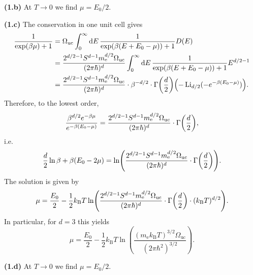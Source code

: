 \documentclass{article}
\makeatletter
\newcommand*{\shifttext}[1]{%
  \settowidth{\@tempdima}{#1}%
  \hspace{-\@tempdima}#1%
}
\newcommand{\plabel}[1]{%
\shifttext{\textbf{#1}\quad}%
}
\makeatother
\begin{document}
\plabel{(1.b)}%
At $T\rightarrow 0$ we find $\mu = E_0/2$.

\plabel{(1.c)}%
The conservation in one unit cell gives
\begin{align*}
  \frac{1}{\exp(\beta \mu) + 1} &= \Omega_{\mathrm{uc}} \int_{0}^\infty \dd{E} \frac{1}{\exp(\beta(E + E_0 - \mu)) + 1} D(E) \\
  &= \frac{2^{d/2-1} S^{d-1} m^{d/2}_{\mathrm{e}}\Omega_{\mathrm{uc}}}{(2\pi\hbar)^d} \int_{0}^\infty \dd{E} \frac{1}{\exp(\beta(E + E_0 - \mu)) + 1} E^{d/2-1} \\
  &= \frac{2^{d/2-1} S^{d-1} m^{d/2}_{\mathrm{e}}\Omega_{\mathrm{uc}}}{(2\pi\hbar)^d} \cdot \beta^{-d/2} \cdot \Gamma\qty(\frac{d}{2}) \qty(-\operatorname{Li}_{d/2} (-e^{-\beta(E_0 - \mu)})).
\end{align*}
Therefore, to the lowest order,
\begin{align*}
  \frac{\beta^{d/2} e^{-\beta\mu}}{e^{-\beta(E_0 - \mu)}} = \frac{2^{d/2-1} S^{d-1} m^{d/2}_{\mathrm{e}}\Omega_{\mathrm{uc}}}{(2\pi\hbar)^d} \cdot \Gamma\qty(\frac{d}{2}),
\end{align*}
i.e.
\[ \frac{d}{2}\ln\beta + \beta(E_0 - 2\mu) = \ln(\frac{2^{d/2-1} S^{d-1} m^{d/2}_{\mathrm{e}}\Omega_{\mathrm{uc}}}{(2\pi\hbar)^d} \cdot \Gamma\qty(\frac{d}{2})). \]
The solution is given by
\[ \mu = \frac{E_0}{2} - \frac{1}{2} k_{\mathrm{B}}T\ln(\frac{2^{d/2-1} S^{d-1} m^{d/2}_{\mathrm{e}}\Omega_{\mathrm{uc}}}{(2\pi\hbar)^d} \cdot \Gamma\qty(\frac{d}{2}) \cdot (k_{\mathrm{B}} T)^{d/2}). \]
In particular, for $d=3$ this yields
\[ \mu = \frac{E_0}{2} - \frac{1}{2}k_{\mathrm{B}}T \ln(\frac{(m_{\mathrm{e}} k_{\mathrm{B}}T)^{3/2}\Omega_{\mathrm{uc}}}{(2\pi\hbar^2)^{3/2}}). \]

\plabel{(1.d)}%
At $T\rightarrow 0$ we find $\mu = E_0/2$.
\end{document}
